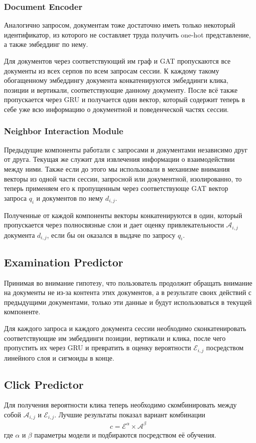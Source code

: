 \documentclass[diploma]{nanolab2015}
\begin{document}
\subsubsection{Document Encoder}
Аналогично запросом, документам тоже достаточно иметь только некоторый идентификатор, из которого не составляет труда получить one-hot представление, а также эмбеддинг по нему.

Для документов через соответствующий им граф и GAT пропускаются все документы из всех серпов по всем запросам сессии. К каждому такому обогащенному эмбеддингу документа конкатенируются эмбеддинги клика, позиции и вертикали, соответствующие данному документу. После всё также пропускается через GRU и получается один вектор, который содержит теперь в себе уже всю информацию о документной и поведенческой частях сессии.

\subsubsection{Neighbor Interaction Module}
Предыдущие компоненты работали с запросами и документами независимо друг от друга. Текущая же служит для извлечения информации о взаимодействии между ними. Также если до этого мы использовали в механизме внимания векторы из одной части сессии, запросной или документной, изолированно, то теперь применяем его к пропущенным через соответствующе GAT вектор запроса $q_i$ и документов по нему $d_{i,j}$.

Полученные от каждой компоненты векторы конкатенируются в один, который пропускается через полносвязные слои и дает оценку привлекательности $\mathcal{A}_{i,j}$ документа $d_{i,j}$, если бы он оказался в выдаче по запросу ${q_i}$.

\subsection{Examination Predictor}
Принимая во внимание гипотезу, что пользователь продолжит обращать внимание на документы не из-за контента этих документов, а в результате своих действий с предыдущими документами, только эти данные и будут использоваться в текущей компоненте.

Для каждого запроса и каждого документа сессии необходимо сконкатенировать соответствующие им эмбеддинги позиции, вертикали и клика, после чего пропустить их через GRU и превратить в оценку вероятности $\mathcal{E}_{i,j}$ посредством линейного слоя и сигмоиды в конце.

\subsection{Click Predictor}
Для получения вероятности клика теперь необходимо скомбинировать между собой $\mathcal{A}_{i,j}$ и $\mathcal{E}_{i,j}$. Лучшие результаты показал вариант комбинации
\begin{align}
    c = \mathcal{E}^\alpha \times \mathcal{A}^\beta
\end{align}
где $\alpha$ и $\beta$ параметры модели и подбираются посредством её обучения.
\end{document}
